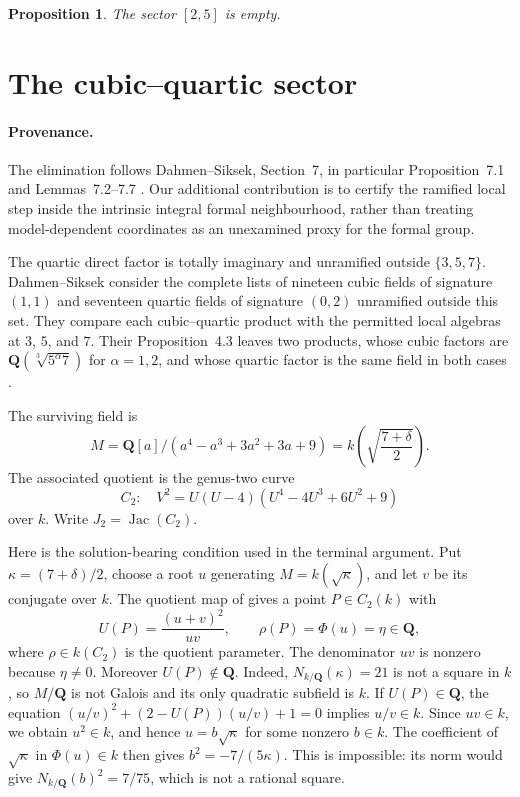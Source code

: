 \documentclass[11pt]{article}
\newcommand{\Q}{\mathbf Q}
\newtheorem{proposition}[theorem]{Proposition}
\theoremstyle{definition}
\theoremstyle{remark}
\begin{document}
\begin{proposition}\label{prop:quadratic-sector}
The sector $[2,5]$ is empty.
\end{proposition}

\section{The cubic--quartic sector}\label{sec:reducible-end}

\paragraph{Provenance.}
The elimination follows Dahmen--Siksek, Section~7, in particular
Proposition~7.1 and Lemmas~7.2--7.7 \cite[Section~7]{DahmenSiksek}.
Our additional contribution is to certify the ramified local step inside the
intrinsic integral formal neighbourhood, rather than treating model-dependent
coordinates as an unexamined proxy for the formal group.

The quartic direct factor is totally imaginary and unramified outside
$\{3,5,7\}$.  Dahmen--Siksek consider the complete lists of nineteen cubic
fields of signature $(1,1)$ and seventeen quartic fields of signature
$(0,2)$ unramified outside this set.  They compare each cubic--quartic
product with the permitted local algebras at $3$, $5$, and $7$.
Their Proposition~4.3 leaves two products, whose cubic factors are
$\Q(\sqrt[3]{5^\alpha7})$ for $\alpha=1,2$, and whose quartic factor is the
same field in both cases \cite[Proposition~4.3]{DahmenSiksek}.

The surviving field is
\begin{equation}\label{eq:quartic-field}
 M=\Q[a]/(a^4-a^3+3a^2+3a+9)
  =k\!\left(\sqrt{\frac{7+\delta}{2}}\right).
\end{equation}
The associated quotient is the genus-two curve
\begin{equation}\label{eq:section7-curve}
 C_2:\quad V^2=U(U-4)(U^4-4U^3+6U^2+9)
\end{equation}
over $k$.  Write $J_2=\operatorname{Jac}(C_2)$.

Here is the solution-bearing condition used in the terminal argument.
Put $\kappa=(7+\delta)/2$, choose a root $u$ generating
$M=k(\sqrt\kappa)$, and let $v$ be its conjugate over $k$.
The quotient map of \cite[Lemma~7.2]{DahmenSiksek} gives a point
$P\in C_2(k)$ with
\[
 U(P)=\frac{(u+v)^2}{uv},\qquad \rho(P)=\Phi(u)=\eta\in\Q,
\]
where $\rho\in k(C_2)$ is the quotient parameter.  The denominator
$uv$ is nonzero because $\eta\ne0$.  Moreover $U(P)\notin\Q$.
Indeed, $N_{k/\Q}(\kappa)=21$ is not a square in $k$, so $M/\Q$
is not Galois and its only quadratic subfield is $k$.
If $U(P)\in\Q$, the equation
$(u/v)^2+(2-U(P))(u/v)+1=0$ implies $u/v\in k$.
Since $uv\in k$, we obtain $u^2\in k$, and hence
$u=b\sqrt\kappa$ for some nonzero $b\in k$.
The coefficient of $\sqrt\kappa$ in $\Phi(u)\in k$ then gives
$b^2=-7/(5\kappa)$.  This is impossible: its norm would give
$N_{k/\Q}(b)^2=7/75$, which is not a rational square.
\end{document}
